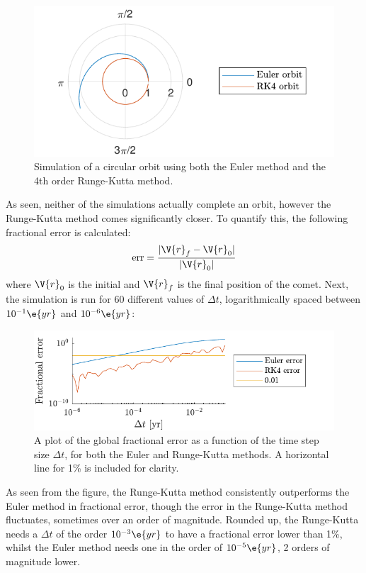 \documentclass[a4paper,10pt]{article} 	%
\numberwithin{equation}{section}
\begin{document}
	\begin{figure}[H]
		\centering
		\includegraphics[width=0.7\linewidth]{CircOrbit.pdf}
		\caption{Simulation of a circular orbit using both the Euler method and the 4th order Runge-Kutta method.}
		\label{fig:CircOrbit}
	\end{figure}
 	As seen, neither of the simulations actually complete an orbit, however the Runge-Kutta method comes significantly closer. To quantify this, the following fractional error is calculated:
 	\begin{equation}
 		\text{err} = \frac{|\V{r}_f-\V{r}_0|}{|\V{r}_0|}
 	\end{equation}
 	where $ \V{r}_0 $ is the initial and $ \V{r}_f $ is the final position of the comet. Next, the simulation is run for 60 different values of $ \Delta t $, logarithmically spaced between $ 10^{-1} \e{yr} $ and $ 10^{-6} \e{yr} $:
	\begin{figure}[H]
		\centering
		\includegraphics[width=0.8\linewidth]{KeplerdtErr.pdf}
		\caption{A plot of the global fractional error as a function of the time step size $ \Delta t $, for both the Euler and Runge-Kutta methods. A horizontal line for 1\% is included for clarity.}
		\label{fig:KeplerdtErr}
	\end{figure}
	As seen from the figure, the Runge-Kutta method consistently outperforms the Euler method in fractional error, though the error in the Runge-Kutta method fluctuates, sometimes over an order of magnitude. Rounded up, the Runge-Kutta needs a $ \Delta t $ of the order $ 10^{-3} \e{yr} $ to have a fractional error lower than 1\%, whilst the Euler method needs one in the order of $ 10^{-5} \e{yr} $, 2 orders of magnitude lower.
	
\end{document}
